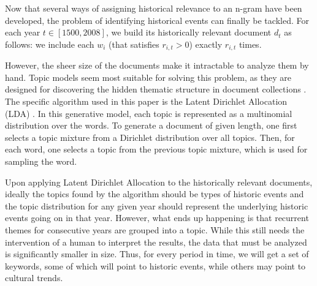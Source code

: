 Now that several ways of assigning historical relevance to an n-gram have been developed, the problem of identifying historical events can finally be tackled. For each year $t \in \left[ 1500, 2008 \right]$, we build its historically relevant document $d_t$ as follows: we include each $w_i$ (that satisfies $r_{i, t} > 0$) exactly $r_{i, t}$ times.

However, the sheer size of the documents make it intractable to analyze them by hand. Topic models seem most suitable for solving this problem, as they are designed for discovering the hidden thematic structure in document collections \cite{Blei:2012:PTM:2133806.2133826}. The specific algorithm used in this paper is the Latent Dirichlet Allocation (LDA) \cite{Blei:2003:LDA:944919.944937}. In this generative model, each topic is represented as a multinomial distribution over the words. To generate a document of given length, one first selects a topic mixture from a Dirichlet distribution over all topics. Then, for each word, one selects a topic from the previous topic mixture, which is used for sampling the word.

Upon applying Latent Dirichlet Allocation to the historically relevant documents, ideally the topics found by the algorithm should be types of historic events and the topic distribution for any given year should represent the underlying historic events going on in that year. However, what ends up happening is that recurrent themes for consecutive years are grouped into a topic. While this still needs the intervention of a human to interpret the results, the data that must be analyzed is significantly smaller in size. Thus, for every period in time, we will get a set of keywords, some of which will point to historic events, while others may point to cultural trends.
